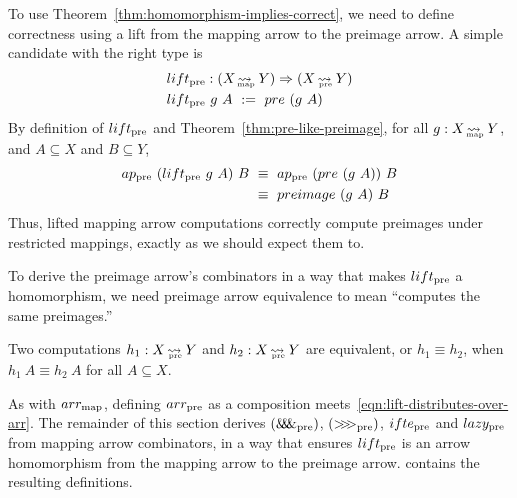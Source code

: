 To use Theorem~\ref{thm:homomorphism-implies-correct}, we need to define correctness using a lift from the mapping arrow to the preimage arrow.
A simple candidate with the right type is
\begin{equation}
\begin{aligned}
	&\liftpre : (X \mapto Y) \tto (X \preto Y) \\
	&\liftpre~g~A \ := \ pre~(g~A)
\end{aligned}
\end{equation}
By definition of $lift_\mathrm{pre}$ and Theorem~\ref{thm:pre-like-preimage}, for all $g : X \operatorname{\rightsquigarrow_{\mspace{-23mu}_\mathrm{map}}} Y$, and $A \subseteq X$ and $B \subseteq Y$,
\begin{equation}
\begin{aligned}
	ap_\mathrm{pre}~(lift_\mathrm{pre}~g~A)~B
		&\ \equiv \ ap_\mathrm{pre}~(pre~(g~A))~B
\\
		&\ \equiv \ preimage~(g~A)~B
\end{aligned}
\end{equation}
Thus, lifted mapping arrow computations correctly compute preimages under restricted mappings, exactly as we should expect them to.

To derive the preimage arrow's combinators in a way that makes $lift_\mathrm{pre}$ a homomorphism, we need preimage arrow equivalence to mean ``computes the same preimages.''

\begin{definition}
Two computations $h_1 : X \operatorname{\rightsquigarrow_{\mspace{-20mu}_\mathrm{pre}}} Y$ and $h_2 : X \operatorname{\rightsquigarrow_{\mspace{-20mu}_\mathrm{pre}}} Y$ are equivalent, or $h_1 \equiv h_2$, when 
$h_1~A \equiv h_2~A$ for all $A \subseteq X$.
\end{definition}

As with $arr_\mathrm{map}$, defining $arr_\mathrm{pre}$ as a composition meets~\eqref{eqn:lift-distributes-over-arr}.
The remainder of this section derives $(\mathit{\&\mspace{-7.5mu}\&\mspace{-7.5mu}\&}_\mathrm{pre})$, $({>}\mspace{-6mu}{>}\mspace{-6mu}{>}_\mathrm{pre})$, $ifte_\mathrm{pre}$ and $lazy_\mathrm{pre}$ from mapping arrow combinators, in a way that ensures $lift_\mathrm{pre}$ is an arrow homomorphism from the mapping arrow to the preimage arrow.  contains the resulting definitions.

